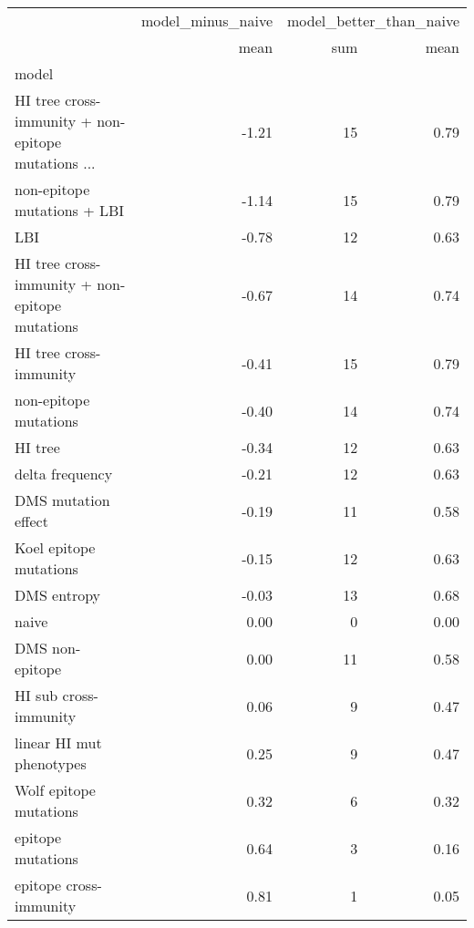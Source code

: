 \begin{tabular}{lrrr}
\toprule
{} & model\_minus\_naive & \multicolumn{2}{l}{model\_better\_than\_naive} \\
{} &              mean &                     sum & mean \\
model                                              &                   &                         &      \\
\midrule
HI tree cross-immunity + non-epitope mutations ... &             -1.21 &                      15 & 0.79 \\
non-epitope mutations + LBI                        &             -1.14 &                      15 & 0.79 \\
LBI                                                &             -0.78 &                      12 & 0.63 \\
HI tree cross-immunity + non-epitope mutations     &             -0.67 &                      14 & 0.74 \\
HI tree cross-immunity                             &             -0.41 &                      15 & 0.79 \\
non-epitope mutations                              &             -0.40 &                      14 & 0.74 \\
HI tree                                            &             -0.34 &                      12 & 0.63 \\
delta frequency                                    &             -0.21 &                      12 & 0.63 \\
DMS mutation effect                                &             -0.19 &                      11 & 0.58 \\
Koel epitope mutations                             &             -0.15 &                      12 & 0.63 \\
DMS entropy                                        &             -0.03 &                      13 & 0.68 \\
naive                                              &              0.00 &                       0 & 0.00 \\
DMS non-epitope                                    &              0.00 &                      11 & 0.58 \\
HI sub cross-immunity                              &              0.06 &                       9 & 0.47 \\
linear HI mut phenotypes                           &              0.25 &                       9 & 0.47 \\
Wolf epitope mutations                             &              0.32 &                       6 & 0.32 \\
epitope mutations                                  &              0.64 &                       3 & 0.16 \\
epitope cross-immunity                             &              0.81 &                       1 & 0.05 \\
\bottomrule
\end{tabular}
